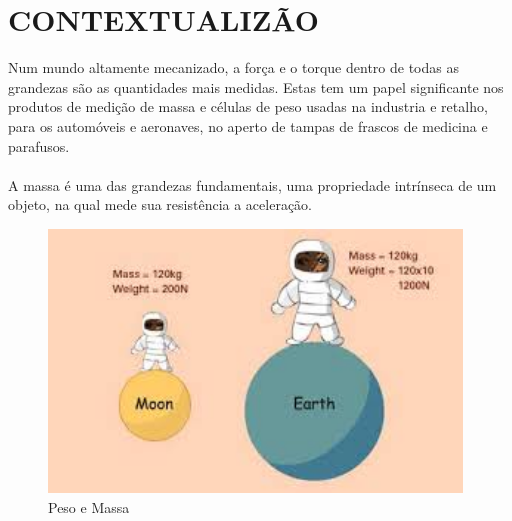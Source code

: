 \section{CONTEXTUALIZÃO}

Num mundo altamente mecanizado, a força e o torque dentro de todas as grandezas são as quantidades mais medidas. Estas tem um papel significante nos produtos de medição de massa e células de peso usadas na industria e retalho, para os automóveis e aeronaves, no aperto de tampas de frascos de medicina e parafusos.\cite{book-9}\\
\\
A massa é uma das grandezas fundamentais, uma propriedade intrínseca de um objeto, na qual mede sua resistência a aceleração.
\begin{figure}[H]
	\centering
	\includegraphics[height=7cm]{./image/PESTA/fisica/mass.jpg}
	\caption{Peso e Massa}
	\label{mass}
\end{figure}
